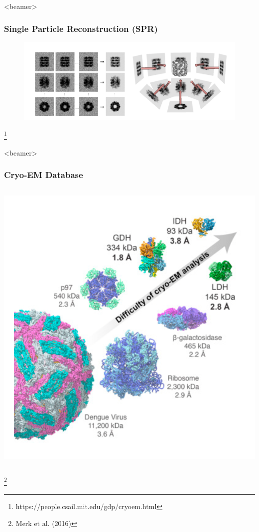 \documentclass{beamer}
\newcommand\blfootnote[1]{%
  \begingroup
  \renewcommand\thefootnote{}\footnote{#1}%
  \addtocounter{footnote}{-1}%
  \endgroup
}
\begin{document}
\begin{frame}<beamer>
\frametitle{Single Particle Reconstruction (SPR)}
\begin{figure}[h]
\centering
{%
\includegraphics[scale=0.65]{figures/backproj.png}}
\label{fig:rawims}
\end{figure} 
\blfootnote{https://people.csail.mit.edu/gdp/cryoem.html}
\end{frame}


\begin{frame}<beamer>
\frametitle{Cryo-EM Database}
\begin{columns}
\centering
\includegraphics[scale=0.4]{figures/news_scales.png}
\end{columns}
\blfootnote{Merk et al. (2016)}
\end{frame}
\end{document}
